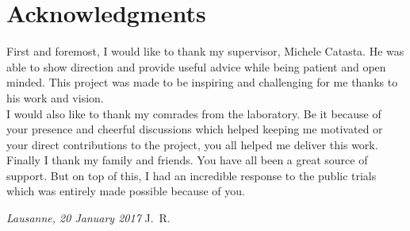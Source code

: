 \chapter*{Acknowledgments}
First and foremost, I would like to thank my supervisor, Michele Catasta. He was able to show direction and provide useful advice while being patient and open minded. This project was made to be inspiring and challenging for me thanks to his work and vision.\\
I would also like to thank my comrades from the laboratory. Be it because of your presence and cheerful discussions which helped keeping me motivated or your direct contributions to the project, you all helped me deliver this work.\\
Finally I thank my family and friends. You have all been a great source of support. But on top of this, I had an incredible response to the public trials which was entirely made possible because of you.

\bigskip
 
\noindent\textit{Lausanne, 20 January 2017}
\hfill J.~R.